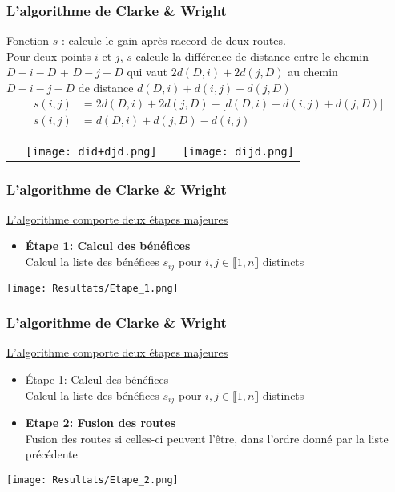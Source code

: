 \documentclass[10pt]{beamer}
\begin{document}
	\begin{frame}
		\frametitle{L'algorithme de Clarke \& Wright}
		\begin{definition}
			Fonction $s$ : calcule le gain après raccord de deux routes. \\Pour deux points $i$ et $j$, $s$ calcule la différence de distance entre le chemin \\$D-i-D$ + $D-j-D$ qui vaut $2d(D,i) + 2d(j,D)$ au chemin\\$D-i-j-D$ de distance $d(D,i) + d(i,j) + d(j,D)$
		\begin{align*}
			s(i,j) &= 2d(D,i) + 2d(j,D) - \lbrack d(D,i) + d(i,j) + d(j,D)\rbrack \\
			s(i,j) &= d(D,i) + d(j,D) - d(i,j)
		\end{align*}
		\end{definition}
		\pause
		\begin{tabular}{cccc}
			\;\;\;\;\;\;\;
			&
			\texttt{[image: did+djd.png]}
			&
			\;\;\;\;\;\;\;	
			\pause		
			&
			\texttt{[image: dijd.png]}			
		\end{tabular}
	\end{frame}

   \begin{frame}
	\frametitle{L'algorithme de Clarke \& Wright}
		\underline{L'algorithme comporte deux étapes majeures}
		\begin{itemize}[label=—]
			\item \textbf{Étape 1: Calcul des bénéfices}
			\pause
			\ \\ Calcul la liste des bénéfices $s_{ij}$ pour $i,j \in \llbracket 1,n \rrbracket$ distincts
		\end{itemize}
		\begin{center}
			\texttt{[image: Resultats/Etape\_1.png]}
		\end{center}
	\end{frame}

	\begin{frame}
		\frametitle{L'algorithme de Clarke \& Wright}
		\underline{L'algorithme comporte deux étapes majeures}
		\begin{itemize}[label=—]
			\item Étape 1: Calcul des bénéfices
			\ \\ Calcul la liste des bénéfices $s_{ij}$ pour $i,j \in \llbracket 1,n \rrbracket$ distincts
			\item \textbf{Etape 2: Fusion des routes}
			\pause
			\ \\ Fusion des routes si celles-ci peuvent l'être, dans l'ordre donné par la liste précédente
		\end{itemize}
		\begin{center}
			\texttt{[image: Resultats/Etape\_2.png]}
		\end{center}
	\end{frame}
\end{document}
